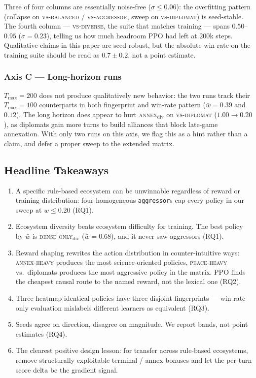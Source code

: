 \documentclass[11pt, a4paper, onecolumn]{article} %
\begin{document}
Three of four columns are essentially noise-free ($\sigma{\leq}0.06$): the
overfitting pattern (collapse on \textsc{vs-balanced} / \textsc{vs-aggressor},
sweep on \textsc{vs-diplomat}) is seed-stable. The fourth column ---
\textsc{vs-diverse}, the suite that matches training --- spans
$0.50$--$0.95$ ($\sigma{=}0.23$), telling us how much headroom PPO had left
at $200$k steps. Qualitative claims in this paper are seed-robust, but the
absolute win rate on the training suite should be read as $0.7 \pm 0.2$,
not a point estimate.

\subsubsection{Axis C --- Long-horizon runs}
\label{sec:rq5}

$T_{\max}{=}200$ does not produce qualitatively new behavior: the two runs
track their $T_{\max}{=}100$ counterparts in both fingerprint and win-rate
pattern ($\bar{w}{=}0.39$ and $0.12$). The long horizon does appear to hurt
\textsc{annex}$_{\text{div}}$ on \textsc{vs-diplomat} ($1.00{\to}0.20$), as
diplomats gain more turns to build alliances that block late-game annexation.
With only two runs on this axis, we flag this as a hint rather than a claim,
and defer a proper sweep to the extended matrix.

\subsection{Headline Takeaways}
\label{sec:summary}

\begin{enumerate}
    \item A specific rule-based ecosystem can be unwinnable regardless of
          reward or training distribution: four homogeneous
          \texttt{aggressor}s cap every policy in our sweep at
          $w{\leq}0.20$ (RQ1).
    \item Ecosystem diversity beats ecosystem difficulty for training. The
          best policy by $\bar{w}$ is \textsc{dense-only}$_{\text{div}}$
          ($\bar{w}{=}0.68$), and it never saw aggressors (RQ1).
    \item Reward shaping rewrites the action distribution in counter-intuitive
          ways: \textsc{annex-heavy} produces the most science-oriented
          policies, \textsc{peace-heavy} vs.\ diplomats produces the most
          aggressive policy in the matrix. PPO finds the cheapest causal
          route to the named reward, not the lexical one (RQ2).
    \item Three heatmap-identical policies have three disjoint fingerprints
          --- win-rate-only evaluation mislabels different learners as
          equivalent (RQ3).
    \item Seeds agree on direction, disagree on magnitude. We report bands,
          not point estimates (RQ4).
    \item The clearest positive design lesson: for transfer across rule-based
          ecosystems, remove structurally exploitable terminal / annex bonuses
          and let the per-turn score delta be the gradient signal.
\end{enumerate}
\end{document}

